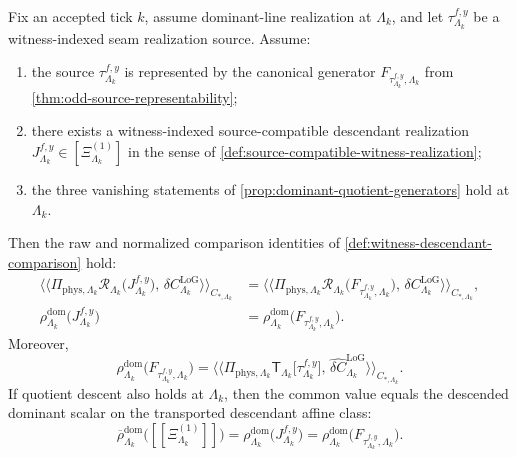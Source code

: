 \documentclass[11pt]{article}
\begin{document}
\begin{theorem}
\label{thm:witness-descended-scalar-comparison}
Fix an accepted tick \(k\), assume dominant-line realization at \(\Lambda_k\), and let
\(
\tau^{f,y}_{\Lambda_k}
\)
be a witness-indexed seam realization source.
Assume:
\begin{enumerate}[leftmargin=2em]
\item the source \(\tau^{f,y}_{\Lambda_k}\) is represented by the canonical generator
  \(
  F_{\tau^{f,y}_{\Lambda_k},\Lambda_k}
  \)
  from \cref{thm:odd-source-representability};
\item there exists a witness-indexed source-compatible descendant realization
  \(
  J^{f,y}_{\Lambda_k}\in[\Xi^{(1)}_{\Lambda_k}]
  \)
  in the sense of \cref{def:source-compatible-witness-realization};
\item the three vanishing statements of \cref{prop:dominant-quotient-generators} hold at
  \(\Lambda_k\).
\end{enumerate}
Then the raw and normalized comparison identities of
\cref{def:witness-descendant-comparison} hold:
\begin{align}
\big\langle\!\big\langle
\Pi_{\mathrm{phys},\Lambda_k}\mathcal R_{\Lambda_k}\!\big(J^{f,y}_{\Lambda_k}\big),\,
\delta C^{\mathrm{LoG}}_{\Lambda_k}
\big\rangle\!\big\rangle_{C_{\ast,\Lambda_k}}
&=
\big\langle\!\big\langle
\Pi_{\mathrm{phys},\Lambda_k}\mathcal R_{\Lambda_k}\!\big(F_{\tau^{f,y}_{\Lambda_k},\Lambda_k}\big),\,
\delta C^{\mathrm{LoG}}_{\Lambda_k}
\big\rangle\!\big\rangle_{C_{\ast,\Lambda_k}},
\label{eq:witness-descendant-comparison-thm-raw}
\\
\rho^{\mathrm{dom}}_{\Lambda_k}\!\big(J^{f,y}_{\Lambda_k}\big)
&=
\rho^{\mathrm{dom}}_{\Lambda_k}\!\big(F_{\tau^{f,y}_{\Lambda_k},\Lambda_k}\big).
\label{eq:witness-descendant-comparison-thm-normalized}
\end{align}
Moreover,
\begin{equation}
\rho^{\mathrm{dom}}_{\Lambda_k}\!\big(F_{\tau^{f,y}_{\Lambda_k},\Lambda_k}\big)
=
\big\langle\!\big\langle
\Pi_{\mathrm{phys},\Lambda_k}\mathsf T_{\Lambda_k}\!\big[\tau^{f,y}_{\Lambda_k}\big],\,
\widehat{\delta C}^{\mathrm{LoG}}_{\Lambda_k}
\big\rangle\!\big\rangle_{C_{\ast,\Lambda_k}}.
\label{eq:witness-descendant-comparison-thm-seam}
\end{equation}
If quotient descent also holds at \(\Lambda_k\), then the common value equals the descended
dominant scalar on the transported descendant affine class:
\begin{equation}
\overline{\rho}^{\mathrm{dom}}_{\Lambda_k}\big([\![\Xi^{(1)}_{\Lambda_k}]\!]\big)
=
\rho^{\mathrm{dom}}_{\Lambda_k}\!\big(J^{f,y}_{\Lambda_k}\big)
=
\rho^{\mathrm{dom}}_{\Lambda_k}\!\big(F_{\tau^{f,y}_{\Lambda_k},\Lambda_k}\big).
\label{eq:witness-descendant-comparison-thm-descended}
\end{equation}
\end{theorem}
\end{document}
